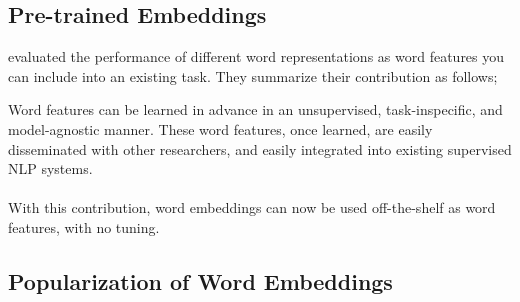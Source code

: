 
\subsection{Pre-trained Embeddings}%
\label{sub:pre_trained_embeddings}

\textcite{p._turian_word_2010} evaluated the performance of different word representations as word features you can include into an existing task.
They summarize their contribution as follows;
\begin{displayquote}
  Word features can be learned in advance in an unsupervised, task-inspecific, and model-agnostic manner.
  These word features, once learned, are easily disseminated with other researchers, and easily integrated into existing supervised NLP systems. \\
  \textelp{} \\
  With this contribution, word embeddings can now be used off-the-shelf as word features, with no tuning.
\end{displayquote}



\subsection{Popularization of Word Embeddings}%
\label{sub:popularization_of_word_embeddings}

